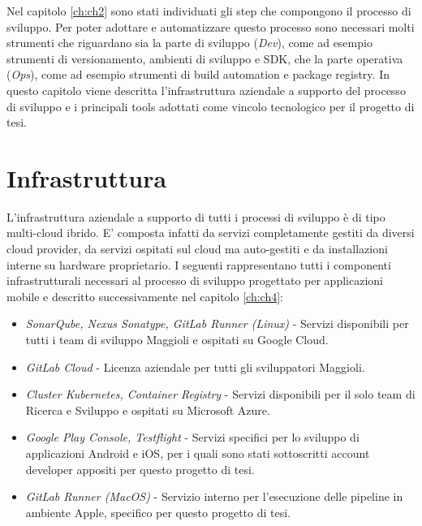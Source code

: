 
Nel capitolo \ref{ch:ch2} sono stati individuati gli step che compongono il processo di sviluppo. Per poter adottare e automatizzare questo processo sono necessari molti strumenti che riguardano sia la parte di sviluppo (\textit{Dev}), come ad esempio strumenti di versionamento, ambienti di sviluppo e SDK, che la parte operativa (\textit{Ops}), come ad esempio strumenti di build automation e package registry. In questo capitolo viene descritta l'infrastruttura aziendale a supporto del processo di sviluppo e i principali tools adottati come vincolo tecnologico per il progetto di tesi.

\section{Infrastruttura}
L'infrastruttura aziendale a supporto di tutti i processi di sviluppo è di tipo multi-cloud ibrido. E' composta infatti da servizi completamente gestiti da diversi cloud provider, da servizi ospitati sul cloud ma auto-gestiti e da installazioni interne su hardware proprietario. I seguenti rappresentano tutti i componenti infrastrutturali necessari al processo di sviluppo progettato per applicazioni mobile e descritto successivamente nel capitolo \ref{ch:ch4}:
\begin{itemize}
    \item \textit{SonarQube, Nexus Sonatype, GitLab Runner (Linux)} - Servizi disponibili per tutti i team di sviluppo Maggioli e ospitati su Google Cloud.
    \item \textit{GitLab Cloud} - Licenza aziendale per tutti gli sviluppatori Maggioli.
    \item \textit{Cluster Kubernetes, Container Registry} - Servizi disponibili per il solo team di Ricerca e Sviluppo e ospitati su Microsoft Azure.
    \item \textit{Google Play Console, Testflight} - Servizi specifici per lo sviluppo di applicazioni Android e iOS, per i quali sono stati sottoscritti account developer appositi per questo progetto di tesi.
    \item \textit{GitLab Runner (MacOS)} - Servizio interno per l'esecuzione delle pipeline in ambiente Apple, specifico per questo progetto di tesi.
\end{itemize}

